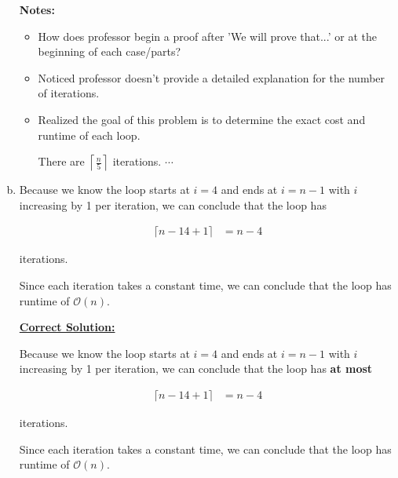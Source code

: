 \documentclass[12pt]{article}
\begin{document}
\begin{enumerate}[a.]
\begin{mdframed}
    \end{mdframed}

    \bigskip

    \textbf{Notes:}

    \begin{itemize}
        \item How does professor begin a proof after 'We will prove that...' or
        at the beginning of each case/parts?

        \item Noticed professor doesn't provide a detailed explanation for the
        number of iterations.

        \item Realized the goal of this problem is to determine the exact cost and runtime
        of each loop.

        \bigskip

        \begin{mdframed}
            There are $\left\lceil \frac{n}{5} \right\rceil$ iterations. $\cdots$
        \end{mdframed}

    \end{itemize}

    \item

    Because we know the loop starts at $i = 4$ and ends at $i = n - 1$ with $i$
    increasing by 1 per iteration, we can conclude that the loop has

    \setcounter{equation}{0}
    \begin{align}
        \lceil n - 1 4 + 1 \rceil &= n - 4
    \end{align}

    iterations.

    \bigskip

    Since each iteration takes a constant time, we can conclude that the loop has
    runtime of $\mathcal{O}(n)$.

    \begin{mdframed}
        \underline{\textbf{Correct Solution:}}

        \bigskip

        Because we know the loop starts at $i = 4$ and ends at $i = n - 1$ with $i$
        increasing by 1 per iteration, we can conclude that the loop has
        \color{red}\textbf{at most}\color{black}

        \setcounter{equation}{0}
        \begin{align}
            \lceil n - 1 4 + 1 \rceil &= n - 4
        \end{align}

        iterations.

        \bigskip

        Since each iteration takes a constant time, we can conclude that the loop has
        runtime of $\mathcal{O}(n)$.

    \end{mdframed}


\end{enumerate}
\end{document}
